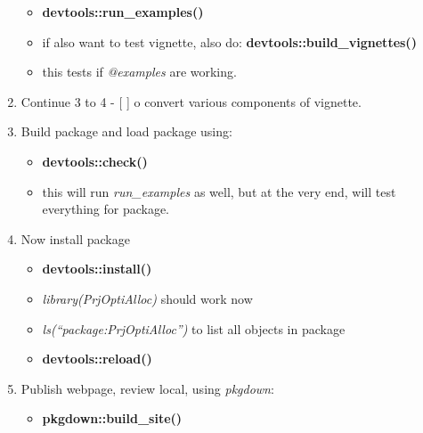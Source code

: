 \documentclass[
]{article}
\providecommand{\tightlist}{%
  \setlength{\itemsep}{0pt}\setlength{\parskip}{0pt}}
\begin{document}
\begin{enumerate}
  \begin{itemize}
  \tightlist
  \item
    \textbf{devtools::run\_examples()}
  \item
    if also want to test vignette, also do:
    \textbf{devtools::build\_vignettes()}
  \item
    this tests if \emph{@examples} are working.
  \end{itemize}
\item
  Continue 3 to 4 - {[} {]} o convert various components of vignette.
\item
  Build package and load package using:

  \begin{itemize}
  \tightlist
  \item
    \textbf{devtools::check()}
  \item
    this will run \emph{run\_examples} as well, but at the very end,
    will test everything for package.\\
  \end{itemize}
\item
  Now install package

  \begin{itemize}
  \tightlist
  \item
    \textbf{devtools::install()}
  \item
    \emph{library(PrjOptiAlloc)} should work now
  \item
    \emph{ls(``package:PrjOptiAlloc'')} to list all objects in package\\
  \item
    \textbf{devtools::reload()}
  \end{itemize}
\item
  Publish webpage, review local, using \emph{pkgdown}:

  \begin{itemize}
  \tightlist
  \item
    \textbf{pkgdown::build\_site()}
  \end{itemize}
\end{enumerate}
\end{document}
